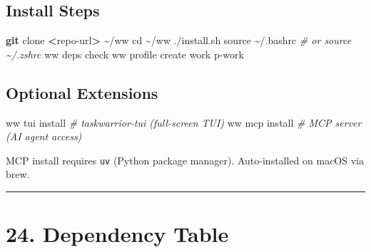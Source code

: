 \documentclass[
]{article}
\newenvironment{Shaded}{\begin{snugshade}}{\end{snugshade}}
\newcommand{\BuiltInTok}[1]{#1}
\newcommand{\CommentTok}[1]{\textcolor[rgb]{0.56,0.35,0.01}{\textit{#1}}}
\newcommand{\ExtensionTok}[1]{#1}
\newcommand{\FunctionTok}[1]{\textcolor[rgb]{0.13,0.29,0.53}{\textbf{#1}}}
\newcommand{\NormalTok}[1]{#1}
\newcommand{\OperatorTok}[1]{\textcolor[rgb]{0.81,0.36,0.00}{\textbf{#1}}}
\begin{document}
\subsection{Install Steps}\label{install-steps}

\begin{Shaded}
\begin{Highlighting}[]
\FunctionTok{git}\NormalTok{ clone }\OperatorTok{\textless{}}\NormalTok{repo{-}url}\OperatorTok{\textgreater{}}\NormalTok{ \textasciitilde{}/ww}
\BuiltInTok{cd}\NormalTok{ \textasciitilde{}/ww}
\ExtensionTok{./install.sh}
\BuiltInTok{source}\NormalTok{ \textasciitilde{}/.bashrc   }\CommentTok{\# or source \textasciitilde{}/.zshrc}
\ExtensionTok{ww}\NormalTok{ deps check}
\ExtensionTok{ww}\NormalTok{ profile create work}
\ExtensionTok{p{-}work}
\end{Highlighting}
\end{Shaded}

\subsection{Optional Extensions}\label{optional-extensions}

\begin{Shaded}
\begin{Highlighting}[]
\ExtensionTok{ww}\NormalTok{ tui install     }\CommentTok{\# taskwarrior{-}tui (full{-}screen TUI)}
\ExtensionTok{ww}\NormalTok{ mcp install     }\CommentTok{\# MCP server (AI agent access)}
\end{Highlighting}
\end{Shaded}

MCP install requires \texttt{uv} (Python package manager).
Auto-installed on macOS via brew.

\begin{center}\rule{0.5\linewidth}{0.5pt}\end{center}

\section{24. Dependency Table}\label{dependency-table}
\end{document}
